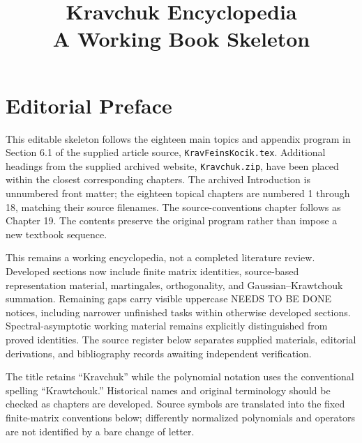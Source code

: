 \documentclass[11pt,oneside]{amsbook}
\title{Kravchuk Encyclopedia\\ A Working Book Skeleton}
\date{}
\theoremstyle{definition}
\theoremstyle{remark}
\begin{document}
\frontmatter
\maketitle

\chapter*{Editorial Preface}
This editable skeleton follows the eighteen main topics and appendix program in Section 6.1 of the supplied article source, \texttt{KravFeinsKocik.tex}. Additional headings from the supplied archived website, \texttt{Kravchuk.zip}, have been placed within the closest corresponding chapters. The archived Introduction is unnumbered front matter; the eighteen topical chapters are numbered 1 through 18, matching their source filenames. The source-conventions chapter follows as Chapter 19. The contents preserve the original program rather than impose a new textbook sequence.

This remains a working encyclopedia, not a completed literature review. Developed sections now include finite matrix identities, source-based representation material, martingales, orthogonality, and Gaussian--Krawtchouk summation. Remaining gaps carry visible uppercase NEEDS TO BE DONE notices, including narrower unfinished tasks within otherwise developed sections. Spectral-asymptotic working material remains explicitly distinguished from proved identities. The source register below separates supplied materials, editorial derivations, and bibliography records awaiting independent verification.

The title retains ``Kravchuk'' while the polynomial notation uses the conventional spelling ``Krawtchouk.'' Historical names and original terminology should be checked as chapters are developed. Source symbols are translated into the fixed finite-matrix conventions below; differently normalized polynomials and operators are not identified by a bare change of letter.
\end{document}
